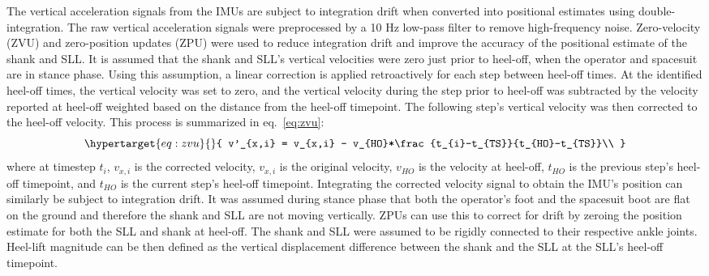 \documentclass[defaultstyle,11pt]{thesis}
\begin{document}
The vertical acceleration signals from the IMUs are subject to integration drift when converted into positional estimates using double-integration.
The raw vertical acceleration signals were preprocessed by a 10 Hz low-pass filter to remove high-frequency noise\citep{Antonsson1985}.
Zero-velocity (ZVU) and zero-position updates (ZPU) were used to reduce integration drift and improve the accuracy of the positional estimate of the shank and SLL.
It is assumed that the shank and SLL's vertical velocities were zero just prior to heel-off, when the operator and spacesuit are in stance phase.
Using this assumption, a linear correction is applied retroactively for each step between heel-off times.
At the identified heel-off times, the vertical velocity was set to zero, and the vertical velocity during the step prior to heel-off was subtracted by the velocity reported at heel-off weighted based on the distance from the heel-off timepoint.
The following step's vertical velocity was then corrected to the heel-off velocity.
This process is summarized in eq.~\ref{eq:zvu}:
\begin{equation}\protect\hypertarget{eq:zvu}{}{
v'_{x,i} = v_{x,i} - v_{HO}*\frac{t_{i}-t_{TS}}{t_{HO}-t_{TS}}\\
}\label{eq:zvu}\end{equation}
where at timestep \(t_i\), \(v_{x,i}\) is the corrected velocity, \(v_{x,i}\) is the original velocity, \(v_{HO}\) is the velocity at heel-off, \(t_{HO}\) is the previous step's heel-off timepoint, and \(t_{HO}\) is the current step's heel-off timepoint.
Integrating the corrected velocity signal to obtain the IMU's position can similarly be subject to integration drift.
It was assumed during stance phase that both the operator's foot and the spacesuit boot are flat on the ground and therefore the shank and SLL are not moving vertically.
ZPUs can use this to correct for drift by zeroing the position estimate for both the SLL and shank at heel-off.
The shank and SLL were assumed to be rigidly connected to their respective ankle joints.
Heel-lift magnitude can be then defined as the vertical displacement difference between the shank and the SLL at the SLL's heel-off timepoint.
\end{document}
